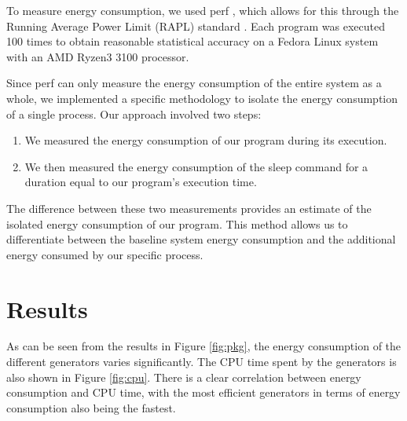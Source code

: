 \documentclass[sigconf]{acmart}
\begin{document}
To measure energy consumption, we used perf \cite{perf}, which allows for this through the Running Average Power Limit (RAPL) standard \cite{rapl}. Each program was executed 100 times to obtain reasonable statistical accuracy on a Fedora Linux system with an AMD Ryzen3 3100 processor.


Since perf can only measure the energy consumption of the entire system as a whole, we implemented a specific methodology to isolate the energy consumption of a single process. Our approach involved two steps:

\begin{enumerate}
\item We measured the energy consumption of our program during its execution.
\item We then measured the energy consumption of the sleep command for a duration equal to our program's execution time.
\end{enumerate}

The difference between these two measurements provides an estimate of the isolated energy consumption of our program. This method allows us to differentiate between the baseline system energy consumption and the additional energy consumed by our specific process.

\section{Results}
\label{sec:results}

As can be seen from the results in Figure \ref{fig:pkg}, the energy consumption of the different generators varies significantly. The CPU time spent by the generators is also shown in Figure \ref{fig:cpu}. There is a clear correlation between energy consumption and CPU time, with the most efficient generators in terms of energy consumption also being the fastest.
\end{document}

